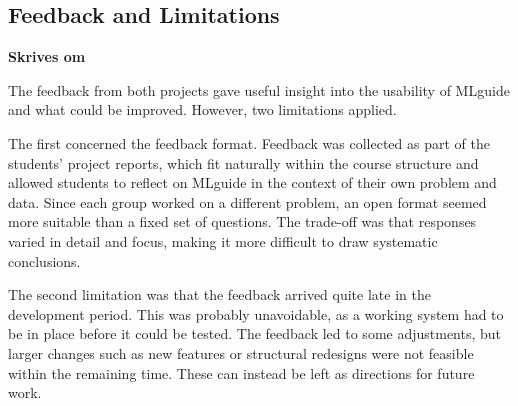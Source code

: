


\subsection{Feedback and Limitations}
\textbf{Skrives om}

The feedback from both projects gave useful insight into the usability of 
MLguide and what could be improved. However, two limitations applied.

The first concerned the feedback format. Feedback was collected as part of
the students' project reports, which fit naturally within the course structure
and allowed students to reflect on MLguide in the context of their own problem
and data. Since each group worked on a different problem, an open format seemed
more suitable than a fixed set of questions. The trade-off was that responses
varied in detail and focus, making it more difficult to draw systematic conclusions.

The second limitation was that the feedback arrived quite late in the development
period. This was probably unavoidable, as a working system had to be in place 
before it could be tested. The feedback led to some adjustments, but larger 
changes such as new features or structural redesigns were not feasible within 
the remaining time. These can instead be left as directions for future work.